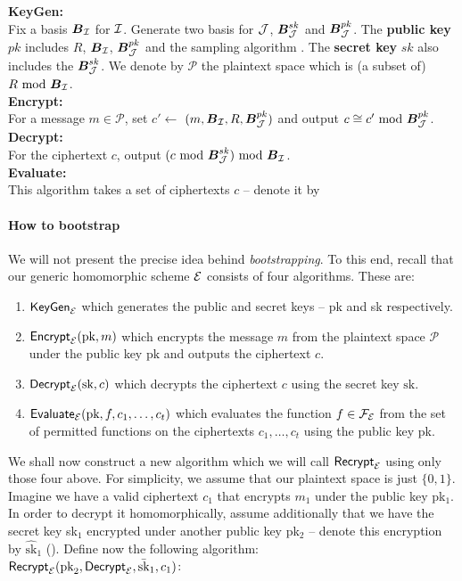\begin{mdframed}
	\textbf{KeyGen:} \\
	Fix a basis $\boldsymbol{B}_{\mathcal{I}}$ for $\mathcal{I}$. Generate two basis for $\mathcal{J}$, $\boldsymbol{B}_{\mathcal{J}}^{sk}$ and $\boldsymbol{B}_{\mathcal{J}}^{pk}$. The \textbf{public key} $pk$ includes $R$, $\boldsymbol{B}_{\mathcal{I}}$, $\boldsymbol{B}_{\mathcal{J}}^{pk}$ and the sampling algorithm . The \textbf{secret key} $sk$  also includes the $\boldsymbol{B}_{\mathcal{J}}^{sk}$. We denote by $\mathcal{P}$ the plaintext space which is (a subset of) $R \text{ mod } \boldsymbol{B}_{\mathcal{I}}$.\\
	\textbf{Encrypt:} \\
	For a message $m \in \mathcal{P}$, set $c' \leftarrow$ $(m, \boldsymbol{B}_{\mathcal{I}}, R, \boldsymbol{B}_{\mathcal{J}}^{pk})$ and output $c \cong c' \text{ mod } \boldsymbol{B}_{\mathcal{J}}^{pk}$.\\
	\textbf{Decrypt:} \\
	For the ciphertext $c$, output $(c \text{ mod } \boldsymbol{B}_{\mathcal{J}}^{sk}) \text{ mod } \boldsymbol{B}_{\mathcal{I}}$.\\
	\textbf{Evaluate:} \\
	This algorithm takes a set of  ciphertexts $c$ -- denote it by 

	

\end{mdframed}
\fi

\paragraph{How to bootstrap}
We will not present the precise idea behind \textit{bootstrapping}. To this end, recall that our generic homomorphic scheme $\mathcal{E}$ consists of four algorithms. These are:
\begin{enumerate}
	\item $\textsf{KeyGen}_{\mathcal{E}}$ which generates the public and secret keys -- pk and sk respectively.
	\item $\textsf{Encrypt}_{\mathcal{E}}(\text{pk}, m)$ which encrypts the message $m$ from the plaintext space $\mathcal{P}$ under the public key $\text{pk}$ and outputs the ciphertext $c$.
	\item $\textsf{Decrypt}_{\mathcal{E}}(\text{sk}, c)$ which decrypts the ciphertext $c$ using the secret key $\text{sk}$.
	\item $\textsf{Evaluate}_{\mathcal{E}}(\text{pk}, f, c_1, \ldots, c_t)$ which evaluates the function $f \in \mathcal{F}_{\mathcal{E}}$ from the set of permitted functions on the ciphertexts $c_1, \ldots, c_t$ using the public key pk.
\end{enumerate}
We shall now construct a new algorithm which we will call $\textsf{Recrypt}_{\mathcal{E}}$ using only those four above. For simplicity, we assume that our plaintext space is just $\{0,1\}$. Imagine we have a valid ciphertext $c_1$ that encrypts $m_1$ under the public key pk$_1$. In order to decrypt it homomorphically, assume additionally that we have the secret key sk$_1$ encrypted under another public key pk$_2$ -- denote this encryption by $\hat{\text{sk}}_1$ (). Define now the following algorithm:\\
$\textsf{Recrypt}_{\mathcal{E}}(\text{pk}_2, \textsf{Decrypt}_{\mathcal{E}}, \bar{\text{sk}}_1, c_1)$:


